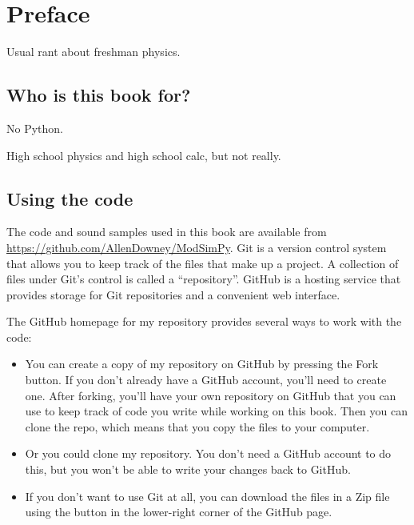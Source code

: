 \documentclass[12pt]{book}
\theoremstyle{exercise}
\begin{document}
\fi

\chapter{Preface}
\label{preface}

Usual rant about freshman physics.

\section{Who is this book for?}

No Python.

High school physics and high school calc, but not really.


\section{Using the code}
\label{code}

The code and sound samples used in this book are available from
\url{https://github.com/AllenDowney/ModSimPy}.  Git is a version
control system that allows you to keep track of the files that
make up a project.  A collection of files under Git's control is
called a ``repository''.  GitHub is a hosting service that provides
storage for Git repositories and a convenient web interface.

The GitHub homepage for my repository provides several ways to
work with the code:

\begin{itemize}

\item You can create a copy of my repository
on GitHub by pressing the {\sf Fork} button.  If you don't already
have a GitHub account, you'll need to create one.  After forking, you'll
have your own repository on GitHub that you can use to keep track
of code you write while working on this book.  Then you can
clone the repo, which means that you copy the files
to your computer.

\item Or you could clone
my repository.  You don't need a GitHub account to do this, but you
won't be able to write your changes back to GitHub.

\item If you don't want to use Git at all, you can download the files
in a Zip file using the button in the lower-right corner of the
GitHub page.

\end{itemize}
\end{document}
